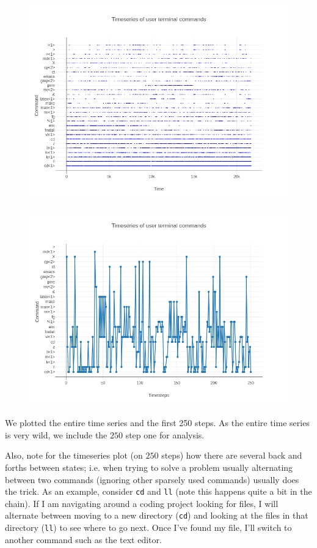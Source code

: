 \documentclass[10pt]{article}
\begin{document}
\begin{figure}[!htb]
  \centering
  \includegraphics[scale=.47]{../pictures/complete-empirical-timeseries.png}
\end{figure}

\begin{figure}[!htb]
  \centering
  \includegraphics[scale=.50]{../pictures/250-empirical-timesteps.png}
\end{figure}

We plotted the entire time series and the first 250 steps. As the entire time series is very wild, we include the $250$ step one for analysis.

Also, note for the timeseries plot (on $250$ steps) how there are several back and forths between states; i.e. when trying to solve a problem usually alternating between two commands (ignoring other sparsely used commands) usually does the trick.
As an example, consider \texttt{cd} and \texttt{ll} (note this happens quite a bit in the chain).
If I am navigating around a coding project looking for files,
I will alternate between moving to a new directory (\texttt{cd}) and looking at the files in that directory (\texttt{ll}) to see where to go next.
Once I've found my file, I'll switch to another command such as the text editor.
\end{document}
